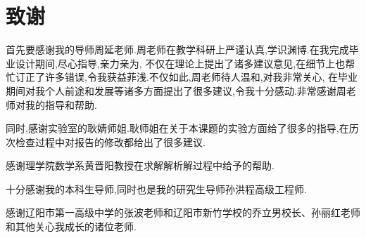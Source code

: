 \chapter{致谢}
首先要感谢我的导师周延老师.周老师在教学科研上严谨认真,学识渊博.在我完成毕业设计期间,尽心指导,亲力亲为,
不仅在理论上提出了诸多建议意见,在细节上也帮忙订正了许多错误,令我获益菲浅.不仅如此,周老师待人温和,对我非常关心,
在毕业期间对我个人前途和发展等诸多方面提出了很多建议,令我十分感动.非常感谢周老师对我的指导和帮助.\par
同时,感谢实验室的耿婧师姐.耿师姐在关于本课题的实验方面给了很多的指导,在历次检查过程中对报告的修改都给出了很多建议.\par
感谢理学院数学系黄晋阳教授在求解解析解过程中给予的帮助.\par
十分感谢我的本科生导师,同时也是我的研究生导师孙洪程高级工程师.\par
感谢辽阳市第一高级中学的张波老师和辽阳市新竹学校的乔立男校长、孙丽红老师和其他关心我成长的诸位老师.